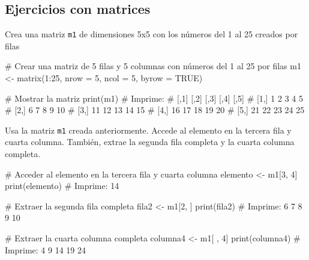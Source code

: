 \documentclass[
  letterpaper,
]{scrbook}
\newenvironment{Shaded}{\begin{snugshade}}{\end{snugshade}}
\newcommand{\AttributeTok}[1]{\textcolor[rgb]{0.40,0.45,0.13}{#1}}
\newcommand{\CommentTok}[1]{\textcolor[rgb]{0.37,0.37,0.37}{#1}}
\newcommand{\ConstantTok}[1]{\textcolor[rgb]{0.56,0.35,0.01}{#1}}
\newcommand{\DecValTok}[1]{\textcolor[rgb]{0.68,0.00,0.00}{#1}}
\newcommand{\FunctionTok}[1]{\textcolor[rgb]{0.28,0.35,0.67}{#1}}
\newcommand{\NormalTok}[1]{\textcolor[rgb]{0.00,0.23,0.31}{#1}}
\newcommand{\OtherTok}[1]{\textcolor[rgb]{0.00,0.23,0.31}{#1}}
\newcommand{\SpecialCharTok}[1]{\textcolor[rgb]{0.37,0.37,0.37}{#1}}
\begin{document}
\hypertarget{ejercicios-con-matrices}{%
\subsection{Ejercicios con matrices}\label{ejercicios-con-matrices}}

Crea una matriz \texttt{m1} de dimensiones 5x5 con los números del 1 al
25 creados por filas

\begin{Shaded}
\begin{Highlighting}[]
\CommentTok{\# Crear una matriz de 5 filas y 5 columnas con números del 1 al 25 por filas}
\NormalTok{m1 }\OtherTok{\textless{}{-}} \FunctionTok{matrix}\NormalTok{(}\DecValTok{1}\SpecialCharTok{:}\DecValTok{25}\NormalTok{, }\AttributeTok{nrow =} \DecValTok{5}\NormalTok{, }\AttributeTok{ncol =} \DecValTok{5}\NormalTok{, }\AttributeTok{byrow =} \ConstantTok{TRUE}\NormalTok{)}

\CommentTok{\# Mostrar la matriz}
\FunctionTok{print}\NormalTok{(m1)}
\CommentTok{\# Imprime:}
\CommentTok{\#      [,1] [,2] [,3] [,4] [,5]}
\CommentTok{\# [1,]    1    2    3    4    5}
\CommentTok{\# [2,]    6    7    8    9   10}
\CommentTok{\# [3,]   11   12   13   14   15}
\CommentTok{\# [4,]   16   17   18   19   20}
\CommentTok{\# [5,]   21   22   23   24   25}
\end{Highlighting}
\end{Shaded}

Usa la matriz \texttt{m1} creada anteriormente. Accede al elemento en la
tercera fila y cuarta columna. También, extrae la segunda fila completa
y la cuarta columna completa.

\begin{Shaded}
\begin{Highlighting}[]
\CommentTok{\# Acceder al elemento en la tercera fila y cuarta columna}
\NormalTok{elemento }\OtherTok{\textless{}{-}}\NormalTok{ m1[}\DecValTok{3}\NormalTok{, }\DecValTok{4}\NormalTok{]}
\FunctionTok{print}\NormalTok{(elemento)}
\CommentTok{\# Imprime: 14}

\CommentTok{\# Extraer la segunda fila completa}
\NormalTok{fila2 }\OtherTok{\textless{}{-}}\NormalTok{ m1[}\DecValTok{2}\NormalTok{, ]}
\FunctionTok{print}\NormalTok{(fila2)}
\CommentTok{\# Imprime: 6 7 8 9 10}

\CommentTok{\# Extraer la cuarta columna completa}
\NormalTok{columna4 }\OtherTok{\textless{}{-}}\NormalTok{ m1[ , }\DecValTok{4}\NormalTok{]}
\FunctionTok{print}\NormalTok{(columna4)}
\CommentTok{\# Imprime: 4 9 14 19 24}
\end{Highlighting}
\end{Shaded}
\end{document}
